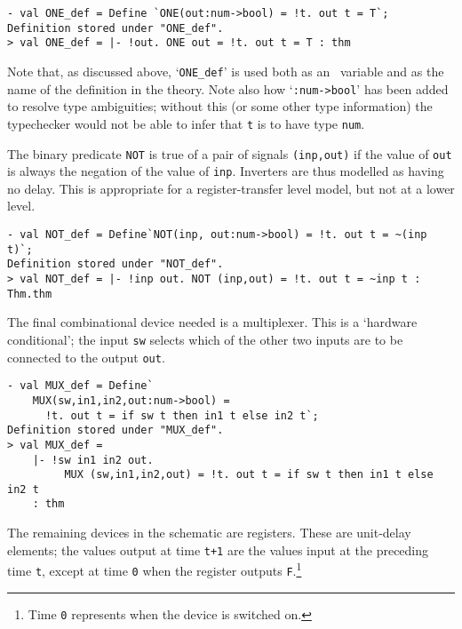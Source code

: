 \begin{session}
\begin{verbatim}
- val ONE_def = Define `ONE(out:num->bool) = !t. out t = T`;
Definition stored under "ONE_def".
> val ONE_def = |- !out. ONE out = !t. out t = T : thm
\end{verbatim}
\end{session}

\noindent Note that, as discussed above, `{\small\verb|ONE_def|}'  is used both
as an \ML\ variable and as the name of the definition in the theory.
Note also how `{\small\verb|:num->bool|}' has been added to resolve
type ambiguities; without this (or some other type information) the
typechecker would not be able to infer that {\small\tt t} is to have
type {\small\tt num}.

The binary predicate {\small\verb|NOT|} is true of a pair of signals
{\small\verb|(inp,out)|} if the value of {\small\verb|out|} is always
the negation of the value of {\small\verb|inp|}. Inverters are thus
modelled as having no delay. This is appropriate for a
register-transfer level model, but not at a lower level.

\begin{session}
\begin{verbatim}
- val NOT_def = Define`NOT(inp, out:num->bool) = !t. out t = ~(inp t)`;
Definition stored under "NOT_def".
> val NOT_def = |- !inp out. NOT (inp,out) = !t. out t = ~inp t : Thm.thm
\end{verbatim}
\end{session}

\noindent The final combinational device needed is a multiplexer.
This is a `hardware conditional'; the input
{\small\verb|sw|} selects which of the other
two inputs are to be connected to the output {\small\verb|out|}.

\begin{session}
\begin{verbatim}
- val MUX_def = Define`
    MUX(sw,in1,in2,out:num->bool) =
      !t. out t = if sw t then in1 t else in2 t`;
Definition stored under "MUX_def".
> val MUX_def =
    |- !sw in1 in2 out.
         MUX (sw,in1,in2,out) = !t. out t = if sw t then in1 t else in2 t
    : thm
\end{verbatim}
\end{session}

The remaining devices in the schematic are registers.  These are
unit-delay elements; the values output at time {\small\verb|t+1|} are
the values input at the preceding time {\small\verb|t|}, except at
time {\small\verb|0|} when the register outputs
{\small\verb|F|}.\footnote{Time {\tt {\small 0}} represents when the
  device is switched on.}

